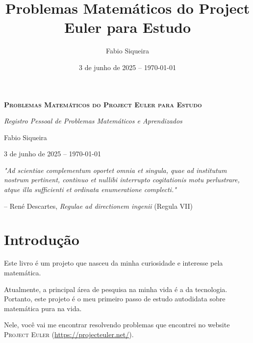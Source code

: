 \documentclass[12pt]{article}
\title{Problemas Matemáticos do Project Euler para Estudo}
\author{Fabio Siqueira}
\date{3 de junho de 2025 -- \today}
\begin{document}
\begin{titlepage}
    \centering
    \vspace*{3cm}
    
    {\Huge \bfseries \textsc{Problemas Matemáticos do Project Euler para Estudo}\par}
    \vspace{0.6cm}

    {\Large \textit{Registro Pessoal de Problemas Matemáticos e Aprendizados}\par}
    \vspace{3cm}

    {\LARGE Fabio Siqueira\par}
    \vspace{1.5cm}

    {\large 3 de junho de 2025 -- \today\par}

    \vfill

    {\small \textit{"Ad scientiae complementum oportet omnia et singula, quae ad institutum nostrum pertinent, continuo et nullibi interrupto cogitationis motu perlustrare, atque illa sufficienti et ordinata enumeratione complecti."} \par
    \vspace{0.1cm}
    -- René Descartes, \textit{Regulae ad directionem ingenii} (Regula VII)\par}

    \vspace{2cm}
\end{titlepage}



\section{Introdução}
\label{sec:introducao}

Este livro é um projeto que nasceu da minha curiosidade e interesse pela matemática.

Atualmente, a principal área de pesquisa na minha vida é a da tecnologia.
Portanto, este projeto é o meu primeiro passo de estudo autodidata sobre matemática pura na vida.

Nele, você vai me encontrar resolvendo problemas que encontrei no website \textsc{Project Euler} (\url{https://projecteuler.net/}).

\newpage
\end{document}
